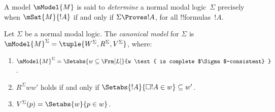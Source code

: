 \documentclass[../../../include/open-logic-section]{subfiles}
\begin{document}


\begin{defn}
  A model $\mModel{M}$ is said to \emph{determine} a normal modal
  logic~$\Sigma$ precisely when $\mSat{M}{!A}$ if and only if $\Sigma
  \Proves !A$, for all !!{formula}s~$!A$.
\end{defn}

\begin{defn}
  Let $\Sigma$ be a normal modal logic. The \emph{canonical model} for
  $\Sigma$ is $\mModel{M}^\Sigma = \tuple{W^\Sigma, R^\Sigma,
    V^\Sigma}$, where:
  \begin{enumerate}
  \item $\mModel{M}^\Sigma = \Setabs{ w \subseteq \Frm[L] }{w \text{
      is complete $\Sigma$-consistent} }$.
  \item $R^\Sigma ww'$ holds if and only if $\Setabs{!A}{\Box!A \in w}
    \subseteq w'$.
  \item $V^\Sigma(p) = \Setabs{w}{p \in w}$.
  \end{enumerate}
\end{defn}
\end{document}
